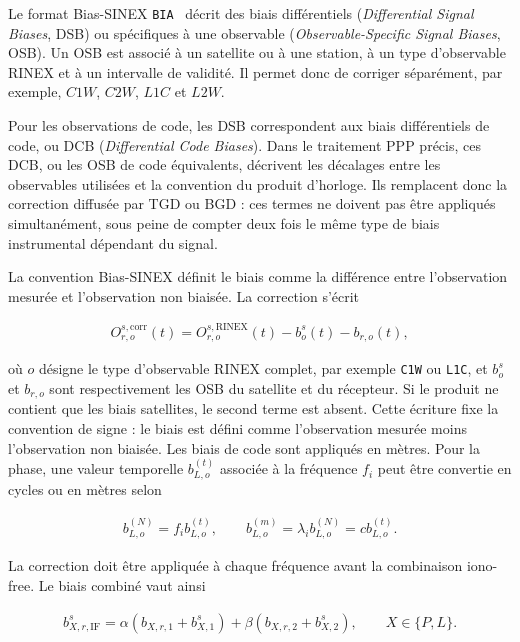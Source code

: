 Le format Bias-SINEX \texttt{BIA}~\cite{schaerSinexBias} décrit des biais différentiels
(\textit{Differential Signal Biases}, DSB) ou spécifiques à une observable
(\textit{Observable-Specific Signal Biases}, OSB). Un OSB est associé à un
satellite ou à une station, à un type d'observable RINEX et à un intervalle de
validité. Il permet donc de corriger séparément, par exemple, $C1W$, $C2W$,
$L1C$ et $L2W$.

Pour les observations de code, les DSB correspondent aux biais différentiels
de code, ou DCB (\textit{Differential Code Biases}). Dans le traitement PPP
précis, ces DCB, ou les OSB de code équivalents, décrivent les décalages entre
les observables utilisées et la convention du produit d'horloge. Ils remplacent
donc la correction diffusée par TGD ou BGD : ces termes ne doivent pas être
appliqués simultanément, sous peine de compter deux fois le même type de biais
instrumental dépendant du signal.

La convention Bias-SINEX définit le biais comme la différence entre
l'observation mesurée et l'observation non biaisée. La correction s'écrit

\begin{align}
O_{r,o}^{s,\mathrm{corr}}(t)
=
O_{r,o}^{s,\mathrm{RINEX}}(t)
-b_o^s(t)-b_{r,o}(t),
\label{eq:bia_correction}
\end{align}

où $o$ désigne le type d'observable RINEX complet, par exemple
\texttt{C1W} ou \texttt{L1C}, et $b_o^s$ et $b_{r,o}$ sont respectivement les
OSB du satellite et du récepteur. Si le produit ne contient que les biais
satellites, le second terme est absent. Cette écriture fixe la convention de
signe : le biais est défini comme l'observation mesurée moins l'observation non
biaisée. Les biais de code sont appliqués en mètres. Pour la phase, une valeur
temporelle $b_{L,o}^{(t)}$ associée à la fréquence $f_i$ peut être convertie en cycles ou
en mètres selon

\begin{align}
b_{L,o}^{(N)}=f_i b_{L,o}^{(t)},
\qquad
b_{L,o}^{(m)}=\lambda_i b_{L,o}^{(N)}=c b_{L,o}^{(t)}.
\label{eq:phase_bias_units}
\end{align}

La correction doit être appliquée à chaque fréquence avant la combinaison
iono-free. Le biais combiné vaut ainsi

\begin{align}
b_{X,r,\mathrm{IF}}^s
=\alpha\left(b_{X,r,1}+b_{X,1}^s\right)
+\beta\left(b_{X,r,2}+b_{X,2}^s\right),
\qquad X\in\{P,L\}.
\label{eq:if_bias}
\end{align}

